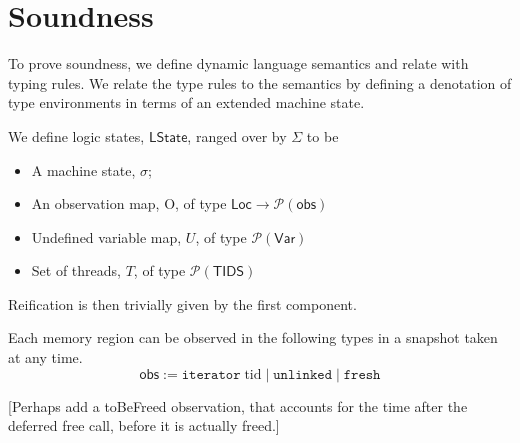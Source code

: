 \section{Soundness}
\label{sec:meminv}
To prove soundness, we define dynamic language semantics and relate with typing rules. We relate the type rules to the semantics by defining a denotation of type environments in terms of an extended machine state.

We define logic states, $\textsf{LState}$, ranged over by $\Sigma$ to be 
\begin{itemize}
\item A machine state, $\sigma$; 
\item An observation map, O, of type $ \textsf{Loc} \to \mathcal{P}(\textsf{obs})$
\item Undefined variable map, $U$, of type $\mathcal{P}(\textsf{Var})$
\item Set of threads, $T$, of type $\mathcal{P}(\textsf{TIDS})$
\end{itemize}
Reification is then trivially given by the first component.

Each memory region can be observed in the following types in a snapshot taken at any time.
\[
\textsf{obs} := \texttt{iterator} \; \mathrm{tid} \mid
			    \texttt{unlinked} \mid
			    \texttt{fresh}
\]

[Perhaps add a toBeFreed observation, that accounts for the time after the deferred free call, before it is actually freed.]

